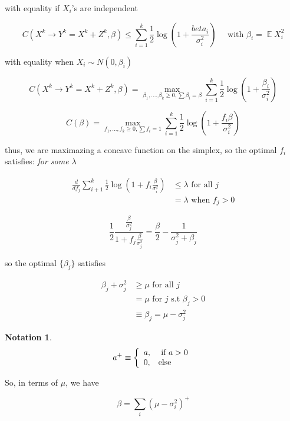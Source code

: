 \documentclass[twoside]{article}
\newtheorem{notation}{Notation}
\theoremstyle{definition} %
\DeclareMathOperator{\E}{\mathbb{E}}%
\begin{document}
with equality if $X_i$'s are independent

\[
  C(X^k \rightarrow Y^k = X^k + Z^k, \beta) \leq \sum_{i = 1}^k \frac{1}{2} \log(1 + \frac{beta_i}{\sigma^2_i}) \quad \text{ with } \beta_i = \E{X_i^2}
\]

with equality when $X_i \sim N(0, \beta_i)$

\[
  C(X^k \rightarrow Y^k = X^k + Z^k, \beta) = \max_{\beta_1, ..., \beta_k \geq 0, \sum \beta_i = \beta} \sum_{i = 1}^k \frac{1}{2} \log(1 + \frac{\beta_i}{\sigma^2_i})
\]

\[
  C(\beta) = \max_{f_1, ..., f_k \geq 0, \sum f_i = 1} \sum_{i = 1}^k \frac{1}{2} \log(1 + \frac{f_i \beta}{\sigma^2_i})
\]

thus, we are maximazing a concave function on the simplex, so the optimal $f_i$ satisfies: \textit{for some $\lambda$}

\begin{align*}
  \frac{d}{d f_j} \sum_{i + 1}^k \frac{1}{2} \log(1 + f_i \frac{\beta}{\sigma_i^2}) &\leq \lambda \text{ for all $j$}\\
              &= \lambda \text{ when } f_j > 0
\end{align*}

\[
  \frac{1}{2} \frac{\frac{\beta}{\sigma^2_j}}{1 + f_j \frac{\beta}{\sigma^2_j}} = \frac{\beta}{2} - \frac{1}{\sigma_j^2 + \beta_j}
\]

so the optimal $\{\beta_j\}$ satisfies

\begin{align*}
  \beta_j + \sigma_j^2 &\geq \mu \text{ for all } j \\
                       &= \mu  \text{ for } j \text{ s.t } \beta_j > 0 \\
                       & \equiv \beta_j = \mu - \sigma_j^2
\end{align*}

\begin{notation}
  \begin{align*}
    a^+ \equiv
    \left\{
    \begin{array}{l l}
      a, & \text{ if } a > 0 \\
      0, & \text{else}
    \end{array}
    \right.
  \end{align*}
\end{notation}

So, in terms of $\mu$, we have

\[
  \beta = \sum_i(\mu - \sigma^2_i)^+
\]
\end{document}
